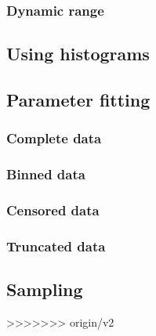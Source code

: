 \subsubsection{Dynamic range}


\subsection{Using histograms}

\subsection{Parameter fitting}
\subsubsection{Complete data}
\subsubsection{Binned data}
\subsubsection{Censored data}
\subsubsection{Truncated data}



\subsection{Sampling}







>>>>>>> origin/v2
